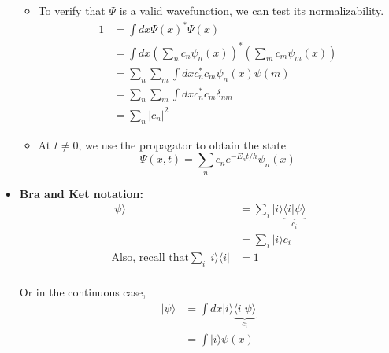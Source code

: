 \documentclass{article}
\newcommand{\ket}[1]{|#1 \rangle}
\newcommand{\bra}[1]{\langle #1|}
\newcommand{\inner}[2]{\langle #1 | #2 \rangle}
\begin{document}
\begin{itemize}
\begin{itemize}
        \item To verify that $\Psi$ is a valid wavefunction, we can test its normalizability.
        \begin{align*}
          1 &= \int dx \Psi(x)^{*} \Psi(x) \\
          &= \int dx \left( \sum_n c_n \psi_n(x) \right)^{*} \left( \sum_m c_m \psi_m(x) \right) \\
          &= \sum_n \sum_m \int dx c_n^{*} c_m \psi_n(x) \psi(m) \\
          &= \sum_n \sum_m \int dx c_n^{*} c_m \delta_{nm} \\
          &= \sum_n |c_n|^2
        \end{align*}

        \item At $t \neq 0$, we use the propagator to obtain the state 
        \[  \Psi(x, t) = \sum_n c_n e^{-E_n t / h} \psi_n(x)  \]
      \end{itemize}

  \item \textbf{Bra and Ket notation:} 
  \begin{align*}
    \ket{\psi} &= \sum_i \ket{i} \underbrace{\inner{i}{\psi}}_{c_i} \\
    &= \sum_i \ket{i} c_i \\
    \text{Also, recall that} \sum_i \ket{i}\bra{i} &= 1 \\
  \end{align*}

  Or in the continuous case, 
  \begin{align*}
    \ket{\psi} &= \int dx \ket{i} \underbrace{\inner{i}{\psi}}_{c_i} \\
    &= \int \ket{i} \psi(x)
  \end{align*}

\end{itemize}

\pagebreak
\end{document}
